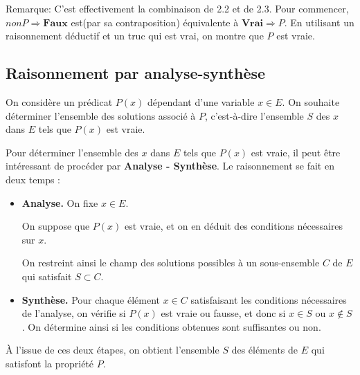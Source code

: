\documentclass{article}
\begin{document}
Remarque: C'est effectivement la combinaison de 2.2 et de 2.3. Pour commencer, \(nonP \Rightarrow \textbf{Faux}\) est(par sa contraposition) équivalente à \(\textbf{Vrai} \Rightarrow P\). En utilisant un raisonnement déductif et un truc qui est vrai, on montre que $P$ est vraie.




\begin{tcolorbox}[colback=cyan!5!white,colframe=cyan!75!black,title=Exercice]


\end{tcolorbox}





\subsection{Raisonnement par analyse-synthèse}

On considère un prédicat \( P(x) \) dépendant d'une variable \( x \in E \). On souhaite déterminer l'ensemble des solutions associé à \( P \), c'est-à-dire l'ensemble \( S \) des \( x \) dans \( E \) tels que \( P(x) \) est vraie.


\begin{tcolorbox}[colback=green!5!white,colframe=green!75!black,title=Point méthode 4.12]

Pour déterminer l'ensemble des \( x \) dans \( E \) tels que \( P(x) \) est vraie, il peut être intéressant de procéder par \textbf{Analyse - Synthèse}. Le raisonnement se fait en deux temps :

\begin{itemize}
    \item \textbf{Analyse.} On fixe \( x \in E \).
    
    On suppose que \( P(x) \) est vraie, et on en déduit des conditions nécessaires sur \( x \).
    
    On restreint ainsi le champ des solutions possibles à un sous-ensemble \( C \) de \( E \) qui satisfait \( S \subset C \).
    
    \item \textbf{Synthèse.} Pour chaque élément \( x \in C \) satisfaisant les conditions nécessaires de l'analyse, on vérifie si \( P(x) \) est vraie ou fausse, et donc si \( x \in S \) ou \( x \notin S \). On détermine ainsi si les conditions obtenues sont suffisantes ou non.
\end{itemize}

À l'issue de ces deux étapes, on obtient l'ensemble \( S \) des éléments de \( E \) qui satisfont la propriété \( P \).



\end{tcolorbox}
\end{document}
